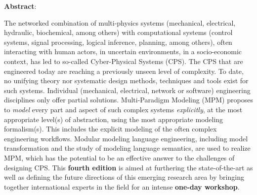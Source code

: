 \documentclass[runningheads]{llncs}
\begin{document}
\noindent
\textbf{Abstract}: 
\begin{small}
The networked combination of multi-physics systems (mechanical, 
electrical, hydraulic, biochemical, among others) with computational systems 
(control systems, signal processing, logical inference, planning, among others), 
often interacting with human actors, in uncertain environments, in a socio-economic 
context, has led to so-called Cyber-Physical Systems (CPS).
%
The CPS that are engineered today are reaching a previously unseen level of 
complexity.
To date, no unifying theory nor systematic design methods, techniques and tools 
exist for such systems.
Individual (mechanical, electrical, network or software) engineering disciplines 
only offer partial solutions.
Multi-Paradigm Modeling (MPM) proposes to \emph{model} every part and aspect of 
such complex systems \emph{explicitly}, at the most appropriate level(s) of 
abstraction, using the most appropriate modeling formalism(s).
This includes the explicit modeling of the often complex engineering workflows.
Modular modeling language engineering, including model transformation and the 
study of modeling language semantics, are used to realize MPM, which has the 
potential to be an effective answer to the challenges of designing CPS.
%
This \textbf{fourth edition} is aimed at furthering the state-of-the-art as well as 
defining the future directions of this emerging research area by bringing together 
international experts in the field for an intense \textbf{one-day workshop}.
\end{small}









\end{document}
